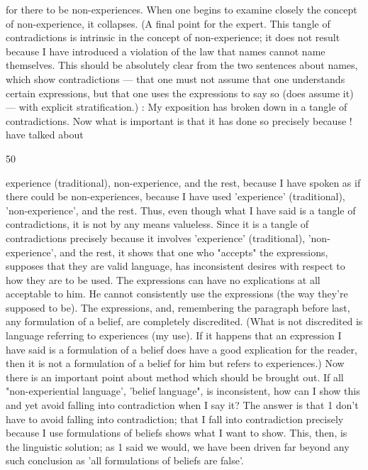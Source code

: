 \documentclass[10pt,twoside]{memoir}
\begin{document}
\begin{enumerate}
{{{{{{{{{{{{{{for there to be non-experiences. When one begins to examine closely the 
concept of non-experience, it collapses. (A final point for the expert. This 
tangle of contradictions is intrinsic in the concept of non-experience; it does 
not result because I have introduced a violation of the law that names cannot 
name themselves. This should be absolutely clear from the two sentences 
about names, which show contradictions --- that one must not assume that 
one understands certain expressions, but that one uses the expressions to say 
so (does assume it) --- with explicit stratification.) : 
My exposition has broken down in a tangle of contradictions. Now 
what is important is that it has done so precisely because ! have talked about 


50 


experience (traditional), non-experience, and the rest, because I have spoken 
as if there could be non-experiences, because I have used 'experience' 
(traditional), 'non-experience', and the rest. Thus, even though what I have 
said is a tangle of contradictions, it is not by any means valueless. Since it is 
a tangle of contradictions precisely because it involves 'experience' 
(traditional), 'non-experience', and the rest, it shows that one who "accepts" 
the expressions, supposes that they are valid language, has inconsistent 
desires with respect to how they are to be used. The expressions can have no 
explications at all acceptable to him. He cannot consistently use the 
expressions (the way they're supposed to be). The expressions, and, 
remembering the paragraph before last, any formulation of a belief, are 
completely discredited. (What is not discredited is language referring to 
experiences (my use). If it happens that an expression I have said is a 
formulation of a belief does have a good explication for the reader, then it is 
not a formulation of a belief for him but refers to experiences.) Now there is 
an important point about method which should be brought out. If all 
"non-experiential language', 'belief language", is inconsistent, how can I 
show this and yet avoid falling into contradiction when I say it? The answer 
is that 1 don't have to avoid falling into contradiction; that I fall into 
contradiction precisely because I use formulations of beliefs shows what I 
want to show. This, then, is the linguistic solution; as 1 said we would, we 
have been driven far beyond any such conclusion as 'all formulations of 
beliefs are false'. 

}}}}}}}}}}}}}}
\end{enumerate}
\end{document}
